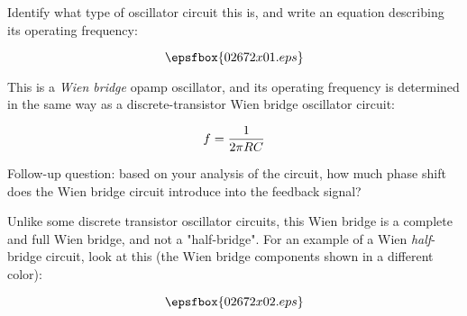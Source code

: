 

Identify what type of oscillator circuit this is, and write an equation describing its operating frequency:

$$\epsfbox{02672x01.eps}$$







This is a {\it Wien bridge} opamp oscillator, and its operating frequency is determined in the same way as a discrete-transistor Wien bridge oscillator circuit:

$$f = {1 \over {2 \pi R C}}$$

\vskip 10pt

Follow-up question: based on your analysis of the circuit, how much phase shift does the Wien bridge circuit introduce into the feedback signal?







Unlike some discrete transistor oscillator circuits, this Wien bridge is a complete and full Wien bridge, and not a "half-bridge".  For an example of a Wien {\it half}-bridge circuit, look at this (the Wien bridge components shown in a different color):

$$\epsfbox{02672x02.eps}$$





